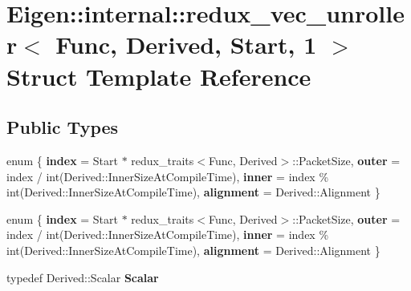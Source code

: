 \hypertarget{struct_eigen_1_1internal_1_1redux__vec__unroller_3_01_func_00_01_derived_00_01_start_00_011_01_4}{}\section{Eigen\+:\+:internal\+:\+:redux\+\_\+vec\+\_\+unroller$<$ Func, Derived, Start, 1 $>$ Struct Template Reference}
\label{struct_eigen_1_1internal_1_1redux__vec__unroller_3_01_func_00_01_derived_00_01_start_00_011_01_4}
\subsection*{Public Types}
\begin{DoxyCompactItemize}
\item 
\mbox{\label{struct_eigen_1_1internal_1_1redux__vec__unroller_3_01_func_00_01_derived_00_01_start_00_011_01_4_a87cead58ae53fdb9c6ebd79ecff086c7}} 
enum \{ {\bfseries index} = Start $\ast$ redux\+\_\+traits$<$Func, Derived$>$\+:\+:Packet\+Size, 
{\bfseries outer} = index / int(Derived\+:\+:Inner\+Size\+At\+Compile\+Time), 
{\bfseries inner} = index \% int(Derived\+:\+:Inner\+Size\+At\+Compile\+Time), 
{\bfseries alignment} = Derived\+:\+:Alignment
 \}
\item 
\mbox{\label{struct_eigen_1_1internal_1_1redux__vec__unroller_3_01_func_00_01_derived_00_01_start_00_011_01_4_a4e8d123007834d493a92c82b4193f170}} 
enum \{ {\bfseries index} = Start $\ast$ redux\+\_\+traits$<$Func, Derived$>$\+:\+:Packet\+Size, 
{\bfseries outer} = index / int(Derived\+:\+:Inner\+Size\+At\+Compile\+Time), 
{\bfseries inner} = index \% int(Derived\+:\+:Inner\+Size\+At\+Compile\+Time), 
{\bfseries alignment} = Derived\+:\+:Alignment
 \}
\item 
\mbox{\label{struct_eigen_1_1internal_1_1redux__vec__unroller_3_01_func_00_01_derived_00_01_start_00_011_01_4_a15445c6523f3bd3d1e58de8d39f2561e}} 
typedef Derived\+::\+Scalar {\bfseries Scalar}

\end{DoxyCompactItemize}
